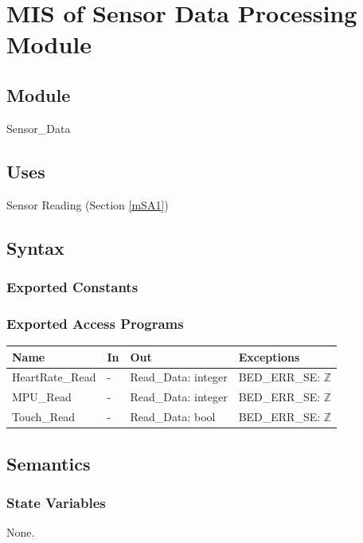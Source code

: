 \documentclass[12pt, titlepage]{article}
\begin{document}
\newpage

\section{MIS of Sensor Data Processing Module} \label{mSA2} 

\subsection{Module}

Sensor\_Data

\subsection{Uses}

Sensor Reading (Section \ref{mSA1})

\subsection{Syntax}

\subsubsection{Exported Constants}

\subsubsection{Exported Access Programs}

\begin{center}
\begin{tabular}{p{4cm} p{1cm} p{4cm} p{4cm}}
\hline
\textbf{Name} & \textbf{In} & \textbf{Out} & \textbf{Exceptions} \\
\hline
HeartRate\_Read & - & Read\_Data: integer & BED\_ERR\_SE: $\mathbb{Z}$ \\
MPU\_Read & -& Read\_Data: integer & BED\_ERR\_SE: $\mathbb{Z}$ \\
Touch\_Read & - & Read\_Data: bool & BED\_ERR\_SE: $\mathbb{Z}$ \\
\hline
\end{tabular}
\end{center}

\subsection{Semantics}

\subsubsection{State Variables}
None.
\end{document}
